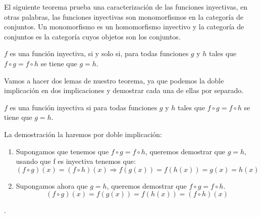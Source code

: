 %
\begin{isabellebody}%
%
%
\isadelimtheory
\isanewline
%
\endisadelimtheory
%
\isatagtheory
%
\endisatagtheory
{\isafoldtheory}%
%
\isadelimtheory
%
\endisadelimtheory
%
\begin{isamarkuptext}%
%
\end{isamarkuptext}\isamarkuptrue%
%
\begin{isamarkuptext}%
%
\end{isamarkuptext}\isamarkuptrue%
%
\begin{isamarkuptext}%
%
\end{isamarkuptext}\isamarkuptrue%
%
\begin{isamarkuptext}%
El siguiente teorema prueba una caracterización de las funciones
 inyectivas, en otras palabras, las funciones inyectivas son
 monomorfismos en la categoría de conjuntos. Un monomorfismo es un
 homomorfismo inyectivo y la categoría de conjuntos es la categoría
 cuyos objetos son los conjuntos.
  
  \begin{teorema}
    $f$ es una función inyectiva, si y solo si, para todas funciones 
 $g$ y $h$  tales que  $f \circ g = f \circ h$ se tiene que $g = h$. 
  \end{teorema}

Vamos a hacer dos lemas de nuestro teorema, ya que podemos la doble 
implicación en dos implicaciones y demostrar cada una de ellas por
 separado.

\begin {lema}
$f$ es una función inyectiva si para todas funciones $g$ y $h$ tales que
 $f \circ g = f \circ h$ se tiene que $g = h.$
\end {lema}
  \begin{demostracion}
    La demostración la haremos por doble implicación: 
\begin {enumerate}
\item Supongamos que tenemos que $f \circ g = f \circ h$, queremos
 demostrar que $g = h$, usando que f es inyectiva tenemos que: \\
$$(f \circ g)(x) = (f \circ h)(x) \Longrightarrow f(g(x)) = f(h(x)) = 
g(x) = h(x)$$
\item Supongamos ahora que $g = h$, queremos demostrar que  $f \circ g
 = f \circ h$. \\
$$(f \circ g)(x) = f(g(x)) = f(h(x)) = (f \circ h)(x)$$
\end {enumerate}
.
  \end{demostracion}


\end{isamarkuptext}
\end{isabellebody}
